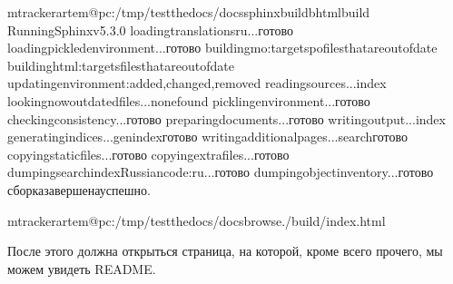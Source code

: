 \documentclass[letterpaper,10pt,russian]{sphinxmanual}
\begin{document}
\begin{sphinxVerbatim}[commandchars=\\\{\}]
mtrackerartem@pc:\PYGZti{}/tmp/test\PYGZus{}the\PYGZus{}docs/docs\PYGZdl{}sphinx\PYGZhy{}build\PYGZhy{}bhtmlbuild
RunningSphinxv5.3.0
loadingtranslations\PYG{o}{[}ru\PYG{o}{]}...готово
loadingpickledenvironment...готово
building\PYG{o}{[}mo\PYG{o}{]}:targetspofilesthatareoutofdate
building\PYG{o}{[}html\PYG{o}{]}:targetsfilesthatareoutofdate
updatingenvironment:added,changed,removed
readingsources...\PYG{o}{[}\PYGZpc{}\PYG{o}{]}index
lookingnow\PYGZhy{}outdatedfiles...nonefound
picklingenvironment...готово
checkingconsistency...готово
preparingdocuments...готово
writingoutput...\PYG{o}{[}\PYGZpc{}\PYG{o}{]}index
generatingindices...genindexготово
writingadditionalpages...searchготово
copyingstaticfiles...готово
copyingextrafiles...готово
dumpingsearchindexRussiancode:ru...готово
dumpingobjectinventory...готово
сборказавершенауспешно.


mtrackerartem@pc:\PYGZti{}/tmp/test\PYGZus{}the\PYGZus{}docs/docs\PYGZdl{}browse./build/index.html
\end{sphinxVerbatim}

\sphinxAtStartPar
После этого должна открыться страница, на которой, кроме всего прочего, мы можем увидеть README.
\end{document}
